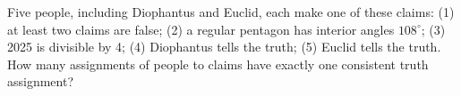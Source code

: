 Five people, including Diophantus and Euclid, each make one of these claims: (1) at least two claims are false; (2) a regular pentagon has interior angles $108^\circ$; (3) 2025 is divisible by 4; (4) Diophantus tells the truth; (5) Euclid tells the truth. How many assignments of people to claims have exactly one consistent truth assignment?
